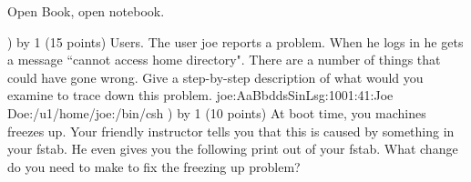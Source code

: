 
\parindent=0in
\nopagenumbers
\newcount\quesno
{}
\def\ques{\number\quesno) \advance\quesno by 1}
\def\aspace{\vskip 1.5in}

Open Book, open notebook.

\ques
(15 points)
Users. The user joe reports a problem. When he logs in he gets
a message ``cannot access home directory".
There are a number of things that could have gone wrong.
Give a step-by-step description of what would you examine to trace down this 
problem.
\hfill\break
{\ltt{}joe:AaBbddsSinLsg:1001:41:Joe Doe:/u1/home/joe:/bin/csh}
\vskip 2.5in
\ques
(10 points)
At boot time, you machines freezes up.
Your friendly instructor tells you that this is caused by something in your 
fstab.
He even gives you the following print out of your fstab.
What change do you need to make to fix the freezing up problem?

